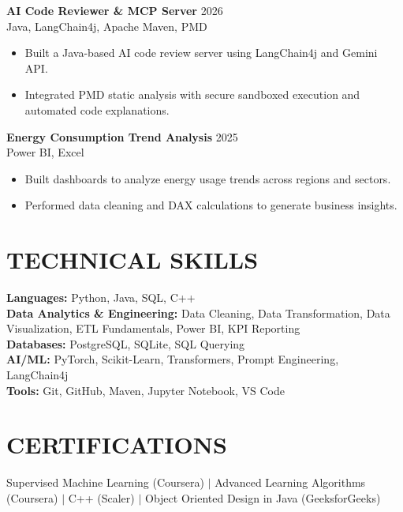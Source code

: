 \documentclass[10pt,letterpaper]{article}
\begin{document}
\textbf{AI Code Reviewer \& MCP Server} \hfill 2026\\
{\footnotesize Java, LangChain4j, Apache Maven, PMD}
\begin{itemize}
\item Built a Java-based AI code review server using LangChain4j and Gemini API.
\item Integrated PMD static analysis with secure sandboxed execution and automated code explanations.
\end{itemize}

\textbf{Energy Consumption Trend Analysis} \hfill 2025\\
{\footnotesize Power BI, Excel}
\begin{itemize}
\item Built dashboards to analyze energy usage trends across regions and sectors.
\item Performed data cleaning and DAX calculations to generate business insights.
\end{itemize}

\section*{TECHNICAL SKILLS}
\textbf{Languages:} Python, Java, SQL, C++\\
\textbf{Data Analytics \& Engineering:} Data Cleaning, Data Transformation, Data Visualization, ETL Fundamentals, Power BI, KPI Reporting\\
\textbf{Databases:} PostgreSQL, SQLite, SQL Querying\\
\textbf{AI/ML:} PyTorch, Scikit-Learn, Transformers, Prompt Engineering, LangChain4j\\
\textbf{Tools:} Git, GitHub, Maven, Jupyter Notebook, VS Code

\section*{CERTIFICATIONS}
Supervised Machine Learning (Coursera) $\vert$
Advanced Learning Algorithms (Coursera) $\vert$
C++ (Scaler) $\vert$
Object Oriented Design in Java (GeeksforGeeks)
\end{document}
